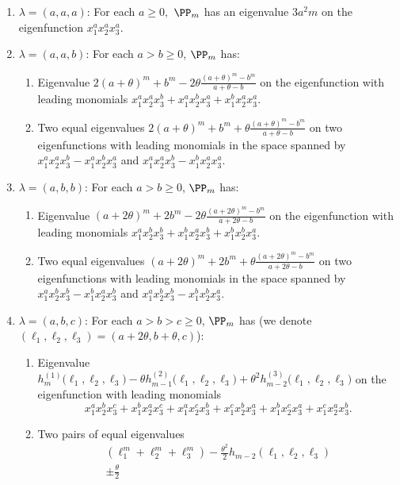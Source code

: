 \begin{enumerate}[label=(\roman*)]
 \item $\lambda=(a,a,a)$: For each $a\ge 0,$ $\PP_m$ has an eigenvalue $3 a^2 m$ on the eigenfunction $x_1^a x_2^a x_3^a$.
 \item $\lambda=(a,a,b)$: For each $a>b \ge 0$, $\PP_m$ has:
  \begin{enumerate}
   \item Eigenvalue $2 (a+\theta)^m + b^m - 2 \theta\frac{(a+\theta)^m-b^m}{a+\theta-b}$ on the eigenfunction with leading monomials $x_1^a x_2^a x_3^b + x_1^a x_2^b x_3^a+ x_1^b x_2^a x_3^a$.
   \item Two equal eigenvalues $2 (a+\theta)^m + b^m + \theta\frac{(a+\theta)^m-b^m}{a+\theta-b}$ on two eigenfunctions with leading monomials in the space spanned by $x_1^a x_2^a x_3^b - x_1^a x_2^b x_3^a$ and $x_1^a x_2^a x_3^b - x_1^b x_2^a x_3^a$.
   \end{enumerate}
 \item $\lambda=(a,b,b)$: For each $a>b \ge 0$, $\PP_m$ has:
   \begin{enumerate}
    \item Eigenvalue  $(a+2\theta)^m + 2b^m - 2 \theta\frac{(a+2\theta)^m-b^m}{a+2\theta-b}$  on the eigenfunction with leading monomials $x_1^a x_2^b x_3^b + x_1^b x_2^a x_3^b+ x_1^b x_2^b x_3^a$.
    \item Two equal eigenvalues $(a+2\theta)^m + 2b^m + \theta\frac{(a+2\theta)^m-b^m}{a+2\theta-b}$  on two eigenfunctions with leading monomials in the space spanned by $x_1^a x_2^b x_3^b - x_1^b x_2^a x_3^b$ and $x_1^a x_2^b x_3^b - x_1^b x_2^b x_3^a$.
   \end{enumerate}
 \item $\lambda=(a,b,c)$: For each $a>b>c \ge 0$, $\PP_m$ has (we denote $(\ell_1,\ell_2,\ell_3)=(a+2\theta,b+\theta,c)$):
   \begin{enumerate}
    \item Eigenvalue $h^{(1)}_m\bigl(\ell_1,\ell_2,\ell_3\bigr)-\theta h^{(2)}_{m-1}\bigl(\ell_1,\ell_2,\ell_3\bigr)+\theta^2  h^{(3)}_{m-2}\bigl(\ell_1,\ell_2,\ell_3\bigr)$ on the eigenfunction with leading monomials
    $$x_1^a x_2^b x_3^c +x_1^b x_2^a x_3^c+x_1^a x_2^c x_3^b+x_1^c x_2^b x_3^a+x_1^b x_2^c x_3^a+x_1^c x_2^a x_3^b.$$
    \item Two pairs of equal eigenvalues
    \begin{multline} \label{eq_irrational_ev}
      \left(  \ell_{1}^{m}+\ell_{2}^{m}+\ell_{3}^{m}\right)
      -\frac{\theta^{2}}{2}h_{m-2}\left(  \ell_{1},\ell_{2},\ell_{3}\right) \\  \pm\frac{\theta}{2}

\end{multline}
\end{enumerate}
\end{enumerate}
